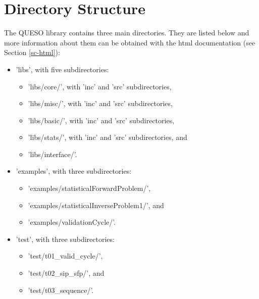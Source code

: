 

\section{Directory Structure} \label{sc-dir-structure}

The QUESO library contains three main directories. They are listed below and more
information about them can be obtained with the html documentation (see Section \ref{sc-html}):
\begin{itemize}
\item {'libs', with five subdirectories:
\begin{itemize}
\item 'libs/core/', with 'inc' and 'src' subdirectories,
\item 'libs/misc/', with 'inc' and 'src' subdirectories,
\item 'libs/basic/', with 'inc' and 'src' subdirectories,
\item 'libs/stats/', with 'inc' and 'src' subdirectories, and
\item 'libs/interface/'.
\end{itemize}
}
\item {'examples', with three subdirectories:
\begin{itemize}
\item 'examples/statisticalForwardProblem/',
\item 'examples/statisticalInverseProblem1/', and
\item 'examples/validationCycle/'.
\end{itemize}
}
\item {'test', with three subdirectories:
\begin{itemize}
\item 'test/t01\_valid\_cycle/',
\item 'test/t02\_sip\_sfp/', and
\item 'test/t03\_sequence/'.
\end{itemize}
}
\end{itemize}

